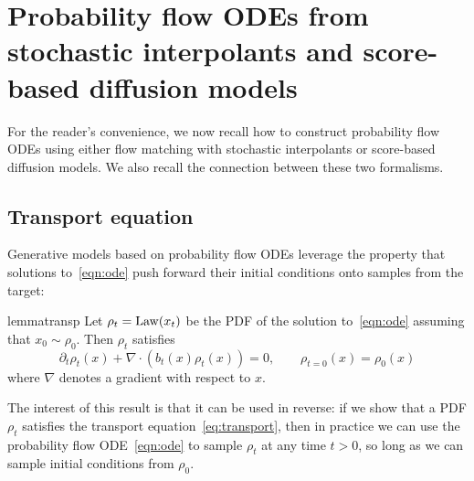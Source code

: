 \section{Probability flow ODEs from stochastic interpolants and score-based diffusion models}
\label{app:si_diff}
For the reader's convenience, we now recall how to construct probability flow ODEs using either flow matching with stochastic interpolants or score-based diffusion models. We also recall the connection between these two formalisms.


\subsection{Transport equation}
\label{app:transp:meas}

Generative models based on probability flow ODEs leverage the property that solutions to~\eqref{eqn:ode} push forward their initial conditions onto samples from the target:
\begin{restatable}{lemma}{transp}
	Let $\rho_t = \operatorname{Law}(x_t)$ be the PDF of the solution to~\eqref{eqn:ode} assuming that $x_0\sim \rho_0$. Then $\rho_t$ satisfies\begin{equation}
		\label{eq:transport}
		\partial_t \rho_t(x) + \nabla \cdot (b_t(x) \rho_t(x)) = 0, \qquad \rho_{t=0}(x)=\rho_0(x)
	\end{equation}
	where $\nabla$ denotes a gradient with respect to $x$.
\end{restatable}
%
The interest of this result is that it can be used in reverse: if we show that a PDF $\rho_t$ satisfies the transport equation~\eqref{eq:transport}, then in practice we can use the probability flow ODE~\eqref{eqn:ode} to sample $\rho_t$ at any time $t>0$, so long as we can sample initial conditions from $\rho_0$.

